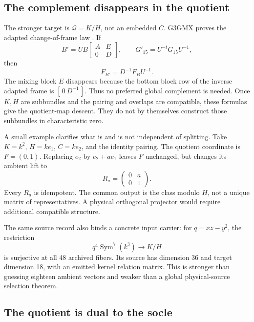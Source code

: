 \documentclass[11pt,a4paper]{article}
\begin{document}
\subsection{The complement disappears in the quotient}
\label{sec:apolar-quotient-descent}

The stronger target is \(\mathcal Q=K/H\), not an embedded \(C\).
G3GMX proves the adapted change-of-frame law
\cite{UnifiedQuotientDescent2026}. If
\[
 B'=UB\begin{bmatrix}A&E\\0&D\end{bmatrix},\qquad
 G'_{15}=U^{-t}G_{15}U^{-1},
\]
then
\[
 F_{B'}=D^{-1}F_BU^{-1}.
 \tag{P8}\label{eq:apolar-quotient-law}
\]
The mixing block \(E\) disappears because the bottom block row of the
inverse adapted frame is \([\,0\ D^{-1}\,]\).
Thus no preferred global complement is needed. Once \(K,H\) are
subbundles and the pairing and overlaps are compatible, these formulas
give the quotient-map descent. They do not by themselves construct those
subbundles in characteristic zero.

A small example clarifies what is and is not independent of splitting.
Take \(K=k^2\), \(H=ke_1\), \(C=ke_2\), and the identity pairing.
The quotient coordinate is \(F=(0,1)\). Replacing \(e_2\) by
\(e_2+a e_1\) leaves \(F\) unchanged, but changes its ambient lift to
\[
 R_a=\begin{pmatrix}0&a\\0&1\end{pmatrix}.
\]
Every \(R_a\) is idempotent. The common output is the class modulo \(H\),
not a unique matrix of representatives. A physical orthogonal projector
would require additional compatible structure.

The same source record also binds a concrete input carrier:
for \(q=xz-y^2\), the restriction
\[
 q^4\operatorname{Sym}^7(k^3)\longrightarrow K/H
\]
is surjective at all 48 archived fibers. Its source has dimension 36
and target dimension 18, with an emitted kernel relation matrix.
This is stronger than guessing eighteen ambient vectors and weaker than
a global physical-source selection theorem.

\subsection{The quotient is dual to the socle}
\label{sec:apolar-socle}
\end{document}
